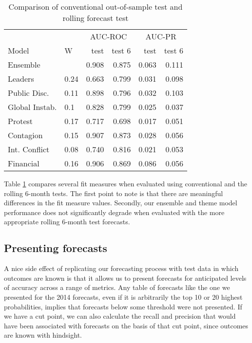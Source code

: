 \documentclass[pdftex,11pt]{article}
\begin{document}
\begin{table}[ht]
\centering
\caption{Comparison of conventional out-of-sample test and rolling forecast test}
\label{test-test6}
\begin{tabular}{llrrrr}
  \toprule
           &      & \multicolumn{2}{c}{AUC-ROC} & \multicolumn{2}{c}{AUC-PR} \\
Model & W & test & test 6 & test & test 6 \\ 
  \midrule
Ensemble &  & 0.908 & 0.875 & 0.063 & 0.111 \\ 
  Leaders & 0.24 & 0.663 & 0.799 & 0.031 & 0.098 \\ 
  Public Disc. & 0.11 & 0.898 & 0.796 & 0.032 & 0.103 \\ 
  Global Instab. & 0.1 & 0.828 & 0.799 & 0.025 & 0.037 \\ 
  Protest & 0.17 & 0.717 & 0.698 & 0.017 & 0.051 \\ 
  Contagion & 0.15 & 0.907 & 0.873 & 0.028 & 0.056 \\ 
  Int. Conflict & 0.08 & 0.740 & 0.816 & 0.021 & 0.053 \\ 
  Financial & 0.16 & 0.906 & 0.869 & 0.086 & 0.056 \\ 
   \bottomrule
\end{tabular}
\end{table}

Table \ref{test-test6} compares several fit measures when evaluated using conventional and the rolling 6-month tests. The first point to note is that there are meaningful differences in the fit measure values. Secondly, our ensemble and theme model performance does not significantly degrade when evaluated with the more appropriate rolling 6-month test forecasts.  

\subsection{Presenting forecasts}

A nice side effect of replicating our forecasting process with test data in which outcomes are known is that it allows us to present forecasts for anticipated levels of accuracy across a range of metrics. Any table of forecasts like the one we presented for the 2014 forecasts, even if it is arbitrarily the top 10 or 20 highest probabilities, implies that forecasts below some threshold were not presented. If we have a cut point, we can also calculate the recall and precision that would have been associated with forecasts on the basis of that cut point, since outcomes are known with hindsight. 
\end{document}
